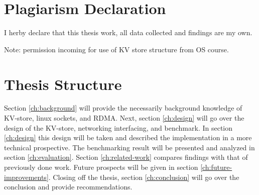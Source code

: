 \section{Plagiarism Declaration}
I herby declare that this thesis work, all data collected and findings are my own.

Note: permission incoming for use of KV store structure from OS course.

\section{Thesis Structure}
Section \ref{ch:background} will provide the necessarily background knowledge of KV-store, linux sockets, and RDMA.
Next, section \ref{ch:design} will go over the design of the KV-store, networking interfacing, and benchmark.
In section \ref{ch:design} this design will be taken and described the implementation in a more technical prospective.
The benchmarking result will be presented and analyzed in section \ref{ch:evaluation}.
Section \ref{ch:related-work} compares findings with that of previously done work.
Future prospects will be given in section \ref{ch:future-improvements}.
Closing off the thesis, section \ref{ch:conclusion} will go over the conclusion and provide recommendations.